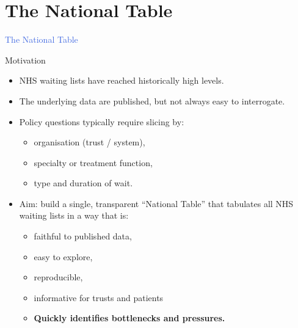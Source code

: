 \documentclass{beamer}
\let\oldtextbf\textbf
\renewcommand{\textbf}[1]{\textcolor{RoyalBlue}{\oldtextbf{#1}}}
\newcommand{\kwRed}[1]{\textcolor{BrickRed}{\oldtextbf{#1}}}
\begin{document}
\section{The National Table}


\begin{frame}
  \centering
    \huge
    \textcolor{RoyalBlue}{The National Table}
\end{frame}



\begin{frame}{Motivation}
  \begin{itemize}
    \item NHS waiting lists have reached historically high levels.
    \item The underlying data are published, but not always easy to interrogate.
    \item Policy questions typically require slicing by:
      \begin{itemize}
        \item organisation (trust / system),
        \item specialty or treatment function,
        \item type and duration of wait.
      \end{itemize}
    \item Aim: build a single, transparent ``National Table'' that
      tabulates all NHS waiting lists in a way that is:
      \begin{itemize} 
        \item faithful to published data,
            \item {easy to explore},
                  \item {reproducible},
                  \item {informative for trusts and patients}
                  \item \kwRed{Quickly identifies bottlenecks and pressures.}
      \end{itemize}
  \end{itemize}
\end{frame}
\end{document}
